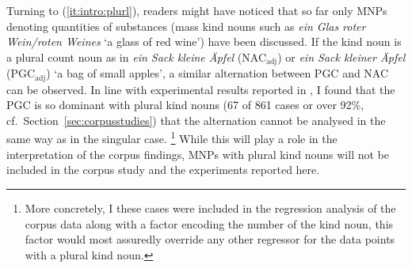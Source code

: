 \documentclass[USenglish]{article}
\newcommand{\Sub}[1]{\ensuremath{\mathrm{_{#1}}}}
\newcommand{\NACa}{NAC\Sub{adj}}
\newcommand{\PGCa}{PGC\Sub{adj}}
\begin{document}
% 

Turning to (\ref{it:intro:plurl}), readers might have noticed that so far only MNPs denoting quantities of substances (mass kind nouns such as \textit{ein Glas roter Wein\slash roten Weines} `a glass of red wine') have been discussed.
If the kind noun is a plural count noun as in \textit{ein Sack kleine Äpfel} (\NACa) or \textit{ein Sack kleiner Äpfel} (\PGCa) `a bag of small apples', a similar alternation between PGC and NAC can be observed.
In line with experimental results reported in \citet[15--16]{Zimmer2015}, I found that the PGC is so dominant with plural kind nouns (67 of 861 cases or over 92\%, cf.\ Section~\ref{sec:corpusstudies}) that the alternation cannot be analysed in the same way as in the singular case.%
\footnote{More concretely, I these cases were included in the regression analysis of the corpus data along with a factor encoding the number of the kind noun, this factor would most assuredly override any other regressor for the data points with a plural kind noun.}
While this will play a role in the interpretation of the corpus findings, MNPs with plural kind nouns will not be included in the corpus study and the experiments reported here.
\end{document}

